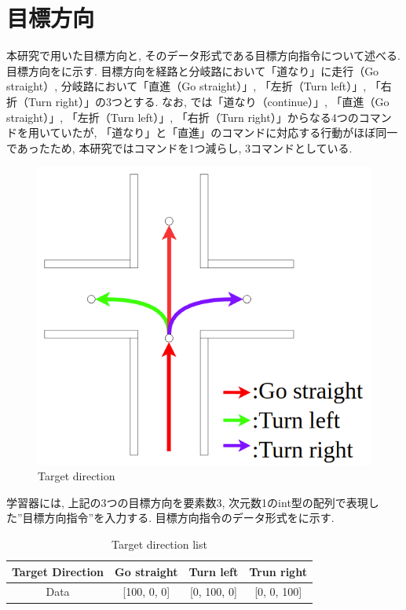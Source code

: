 
\section{目標方向}
本研究で用いた目標方向と, そのデータ形式である目標方向指令について述べる. 目標方向をに示す. 目標方向を経路と分岐路において「道なり」に走行（Go straight）, 分岐路において「直進（Go straight）」, 「左折（Turn left）」, 「右折（Turn right）」の3つとする. なお, \cite{mech}では「道なり（continue）」, 「直進（Go straight）」, 「左折（Turn left）」, 「右折（Turn right）」からなる4つのコマンドを用いていたが, 「道なり」と「直進」のコマンドに対応する行動がほぼ同一であったため, 本研究ではコマンドを1つ減らし, 3コマンドとしている.

\begin{figure}[hbtp]
  \centering
 \includegraphics[keepaspectratio, scale=0.40]
      {images/direction.png}
 \caption{Target direction}
 \label{Fig:direction}
\end{figure}

学習器には, 上記の3つの目標方向を要素数3, 次元数1のint型の配列で表現した”目標方向指令”を入力する. 目標方向指令のデータ形式をに示す.

\begin{table}[hbtp]
  \caption{Target direction list}
  \label{table:direction}
  \centering
  \begin{tabular}{|c|c|c|c|}
    \hline
    Target Direction  & Go straight & Turn left & Trun right\\
    \hline
    Data & [100, 0, 0] & [0, 100, 0] & [0, 0, 100]\\
    \hline
  \end{tabular}
\end{table}


\newpage
